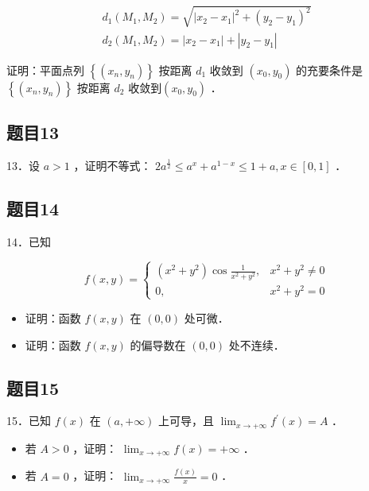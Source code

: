 \documentclass{article}
\begin{document}
\[
\begin{gathered}
d_{1}\left(M_{1}, M_{2}\right)=\sqrt{\left|x_{2}-x_{1}\right|^{2}+\left(y_{2}-y_{1}\right)^{2}} \\
d_{2}\left(M_{1}, M_{2}\right)=\left|x_{2}-x_{1}\right|+\left|y_{2}-y_{1}\right|
\end{gathered}
\]

证明：平面点列 \(\left\{\left(x_{n}, y_{n}\right)\right\}\) 按距离 \(d_{1}\) 收敛到 \(\left(x_{0}, y_{0}\right)\) 的充要条件是 \(\left\{\left(x_{n}, y_{n}\right)\right\}\) 按距离 \(d_{2}\) 收敛到\(\left(x_{0}, y_{0}\right)\) ．

\subsection{题目13}
13．设 \(a>1\) ，证明不等式： \(2 a^{\frac{1}{2}} \leq a^{x}+a^{1-x} \leq 1+a, x \in[0,1]\) ．

\subsection{题目14}
14．已知

\[
f(x, y)= \begin{cases}\left(x^{2}+y^{2}\right) \cos \frac{1}{x^{2}+y^{2}}, & x^{2}+y^{2} \neq 0 \\ 0, & x^{2}+y^{2}=0\end{cases}
\]

\begin{itemize}
  \item[（1）] 证明：函数 \(f(x, y)\) 在 \((0,0)\) 处可微．
  \item[（2）] 证明：函数 \(f(x, y)\) 的偏导数在 \((0,0)\) 处不连续．
\end{itemize}

\subsection{题目15}
15．已知 \(f(x)\) 在 \((a,+\infty)\) 上可导，且 \(\lim _{x \rightarrow+\infty} f^{\prime}(x)=A\) ．

\begin{itemize}
  \item[（1）] 若 \(A>0\) ，证明： \(\lim _{x \rightarrow+\infty} f(x)=+\infty\) ．
  \item[（2）] 若 \(A=0\) ，证明： \(\lim _{x \rightarrow+\infty} \frac{f(x)}{x}=0\) ．
\end{itemize}
\end{document}
